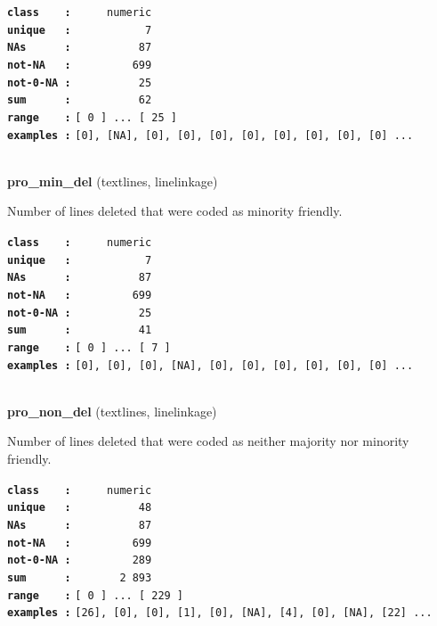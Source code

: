 \documentclass[]{article}
\begin{document}
\textbf{\texttt{class\ \ \ \ :}} \texttt{~~~~~numeric}\\
\textbf{\texttt{unique\ \ \ :}} \texttt{~~~~~~~~~~~7}\\
\textbf{\texttt{NAs\ \ \ \ \ \ :}} \texttt{~~~~~~~~~~87}\\
\textbf{\texttt{not-NA\ \ \ :}} \texttt{~~~~~~~~~699}\\
\textbf{\texttt{not-0-NA\ :}} \texttt{~~~~~~~~~~25}\\
\textbf{\texttt{sum\ \ \ \ \ \ :}} \texttt{~~~~~~~~~~62}\\
\textbf{\texttt{range\ \ \ \ :}}
\texttt{{[}\ 0\ {]}\ ...\ {[}\ 25\ {]}}\\
\textbf{\texttt{examples\ :}}
\texttt{{[}0{]},\ {[}NA{]},\ {[}0{]},\ {[}0{]},\ {[}0{]},\ {[}0{]},\ {[}0{]},\ {[}0{]},\ {[}0{]},\ {[}0{]}\ ...}\\

~

\textbf{pro\_min\_del} (textlines, linelinkage)

Number of lines deleted that were coded as minority friendly.

\textbf{\texttt{class\ \ \ \ :}} \texttt{~~~~~numeric}\\
\textbf{\texttt{unique\ \ \ :}} \texttt{~~~~~~~~~~~7}\\
\textbf{\texttt{NAs\ \ \ \ \ \ :}} \texttt{~~~~~~~~~~87}\\
\textbf{\texttt{not-NA\ \ \ :}} \texttt{~~~~~~~~~699}\\
\textbf{\texttt{not-0-NA\ :}} \texttt{~~~~~~~~~~25}\\
\textbf{\texttt{sum\ \ \ \ \ \ :}} \texttt{~~~~~~~~~~41}\\
\textbf{\texttt{range\ \ \ \ :}}
\texttt{{[}\ 0\ {]}\ ...\ {[}\ 7\ {]}}\\
\textbf{\texttt{examples\ :}}
\texttt{{[}0{]},\ {[}0{]},\ {[}0{]},\ {[}NA{]},\ {[}0{]},\ {[}0{]},\ {[}0{]},\ {[}0{]},\ {[}0{]},\ {[}0{]}\ ...}\\

~

\textbf{pro\_non\_del} (textlines, linelinkage)

Number of lines deleted that were coded as neither majority nor minority
friendly.

\textbf{\texttt{class\ \ \ \ :}} \texttt{~~~~~numeric}\\
\textbf{\texttt{unique\ \ \ :}} \texttt{~~~~~~~~~~48}\\
\textbf{\texttt{NAs\ \ \ \ \ \ :}} \texttt{~~~~~~~~~~87}\\
\textbf{\texttt{not-NA\ \ \ :}} \texttt{~~~~~~~~~699}\\
\textbf{\texttt{not-0-NA\ :}} \texttt{~~~~~~~~~289}\\
\textbf{\texttt{sum\ \ \ \ \ \ :}} \texttt{~~~~~~~2~893}\\
\textbf{\texttt{range\ \ \ \ :}}
\texttt{{[}\ 0\ {]}\ ...\ {[}\ 229\ {]}}\\
\textbf{\texttt{examples\ :}}
\texttt{{[}26{]},\ {[}0{]},\ {[}0{]},\ {[}1{]},\ {[}0{]},\ {[}NA{]},\ {[}4{]},\ {[}0{]},\ {[}NA{]},\ {[}22{]}\ ...}\\
\end{document}
